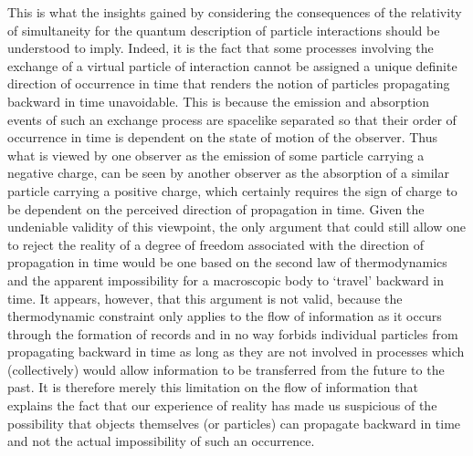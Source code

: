 \documentclass[notitlepage,12pt]{report}
\begin{document}
This is what the insights gained by considering the consequences of the relativity of simultaneity for the quantum description of particle interactions should be understood to imply. Indeed, it is the fact that some processes involving the exchange of a virtual particle of interaction cannot be assigned a unique definite direction of occurrence in time that renders the notion of particles propagating backward in time unavoidable. This is because the emission and absorption events of such an exchange process are spacelike separated so that their order of occurrence in time is dependent on the state of motion of the observer. Thus what is viewed by one observer as the emission of some particle carrying a negative charge, can be seen by another observer as the absorption of a similar particle carrying a positive charge, which certainly requires the sign of charge to be dependent on the perceived direction of propagation in time. Given the undeniable validity of this viewpoint, the only argument that could still allow one to reject the reality of a degree of freedom associated with the direction of propagation in time would be one based on the second law of thermodynamics and the apparent impossibility for a macroscopic body to `travel' backward in time. It appears, however, that this argument is not valid, because the thermodynamic constraint only applies to the flow of information as it occurs through the formation of records and in no way forbids individual particles from propagating backward in time as long as they are not involved in processes which (collectively) would allow information to be transferred from the future to the past. It is therefore merely this limitation on the flow of information that explains the fact that our experience of reality has made us suspicious of the possibility that objects themselves (or particles) can propagate backward in time and not the actual impossibility of such an occurrence.
\end{document}
